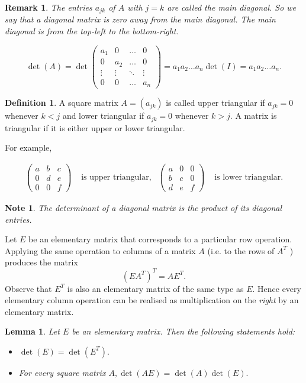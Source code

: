 \documentclass[12pt, a4paper]{article}
\newtheorem*{remark}{Remark}
\newtheorem*{note}{Note}
\theoremstyle{definition}
\newtheorem{definition}{Definition}[section]
\theoremstyle{plain}
\newtheorem{lemma}[theorem]{Lemma}
\begin{document}
\begin{remark}
The entries $a_{jk}$ of $A$ with $j = k$ are called the \textit{main diagonal}. So we say that a diagonal matrix is zero away from the main diagonal. The main diagonal is from the top-left to the bottom-right.
\end{remark}

$$\det{(A)}=\det\begin{pmatrix} 
a_1 & 0 & \ldots & 0 \\  
0 & a_2 & \ldots & 0 \\
\vdots & \vdots & \ddots & \vdots \\
0 & 0 & \ldots & a_n
\end{pmatrix} = a_1a_2\ldots a_n \det{(I)}=a_1a_2\ldots a_n.$$

\begin{definition} A square matrix $A = (a_{jk})$ is called upper triangular if $a_{jk} = 0$ whenever $k < j$ and lower triangular if $a_{jk} = 0$ whenever $k > j.$ A matrix is triangular if it is either upper or lower triangular. \end{definition}

For example,

$$\begin{aligned}
\begin{pmatrix} a&b&c\\0&d&e\\0&0&f \end{pmatrix} & \text{ is upper triangular,} & \begin{pmatrix} a&0&0 \\ b&c&0 \\ d&e&f \end{pmatrix}
& \text{ is lower triangular.}\end{aligned}$$

\begin{note}
The determinant of a diagonal matrix is the product of its diagonal entries.
\end{note}

Let $E$ be an elementary matrix that corresponds to a particular row operation. Applying the same operation to columns of a matrix $A$ (i.e. to the rows of $A^T$ ) produces the matrix $$(EA^T)^T=AE^T.$$ Observe that $E^T$ is also an elementary matrix of the same type as $E$. Hence every elementary column operation can be realised as multiplication on the \textit{right} by an elementary matrix.

\begin{lemma} Let $E$ be an elementary matrix. Then the following statements hold: 
\begin{itemize}
	
	\item $\det{(E)}=\det{(E^T)}.$
	\item For every square matrix $A, \det{(AE)}=\det{(A)}\det{(E)}.$

\end{itemize}
\end{lemma}
\end{document}
